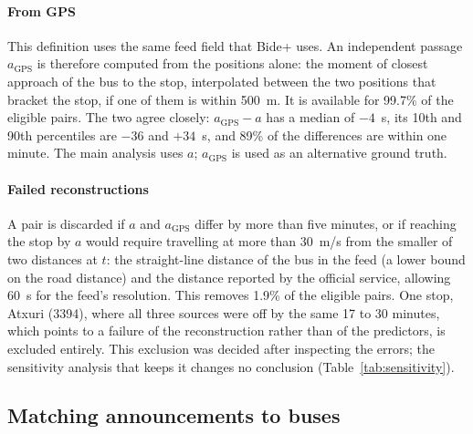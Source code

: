 \paragraph{From GPS} This definition uses the same feed field that Bide+ uses. An independent passage $a_{\mathrm{GPS}}$
is therefore computed from the positions alone: the moment of closest approach of the bus to the stop, interpolated between
the two positions that bracket the stop, if one of them is within 500~m. It is available for 99.7\% of the eligible pairs. The two
agree closely: $a_{\mathrm{GPS}} - a$ has a median of $-4$~s, its 10th and 90th percentiles are $-36$ and $+34$~s, and
89\% of the differences are within one minute. The main analysis uses $a$; $a_{\mathrm{GPS}}$ is used as an alternative
ground truth.

\paragraph{Failed reconstructions} A pair is discarded if $a$ and $a_{\mathrm{GPS}}$ differ by more than five minutes, or
if reaching the stop by $a$ would require travelling at more than 30~m/s from the smaller of two distances at $t$: the
straight-line distance of the bus in the feed (a lower bound on the road distance) and the distance reported by the
official service, allowing 60~s for the feed's resolution. This removes 1.9\% of the
eligible pairs. One stop, Atxuri (3394), where all three sources were off by the same 17 to 30 minutes, which points to a
failure of the reconstruction rather than of the predictors, is excluded entirely. This exclusion was decided after
inspecting the errors; the sensitivity analysis that keeps it changes no conclusion (Table~\ref{tab:sensitivity}).

\subsection{Matching announcements to buses}
\label{sec:matching}


